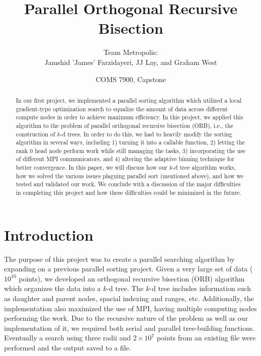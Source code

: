 \documentclass{article}
\begin{document}
\title{Parallel Orthogonal Recursive Bisection}
\author{Team Metropolis: \\
		Jamshid 'James' Farzidayeri, JJ Lay, and Graham West}
\date{COMS 7900, Capstone}

\maketitle

\begin{abstract}
In our first project, we implemented a parallel sorting algorithm which utilized a local gradient-type optimization search to equalize the amount of data across different compute nodes in order to achieve maximum efficiency. In this project, we applied this algorithm to the problem of parallel orthogonal recursive bisection (ORB), i.e., the construction of $k$-d trees. In order to do this, we had to heavily modify the sorting algorithm in several ways, including 1) turning it into a callable function, 2) letting the rank 0 head node perform work while still managing the tasks, 3) incorporating the use of different MPI communicators, and 4) altering the adaptive binning technique for better convergence. In this paper, we will discuss how our $k$-d tree algorithm works, how we solved the various issues plaguing parallel sort (mentioned above), and how we tested and validated our work. We conclude with a discussion of the major difficulties in completing this project and how these difficulties could be minimized in the future.
\end{abstract}


\tableofcontents


\section{Introduction}

The purpose of this project was to create a parallel searching algorithm by expanding on a previous parallel sorting project. Given a very large set of data ($10^{10}$ points), we developed an orthogonal recursive bisection (ORB) algorithm which organizes the data into a $k$-d tree. The $k$-d tree includes information such as daughter and parent nodes, spacial indexing and ranges, etc. Additionally, the implementation also maximized the use of MPI, having multiple computing nodes performing the work. Due to the recursive nature of the problem as well as our implementation of it, we required both serial and parallel tree-building functions. Eventually a search using three radii and $2 \times 10^7$ points from an existing file were performed and the output saved to a file.
\end{document}
